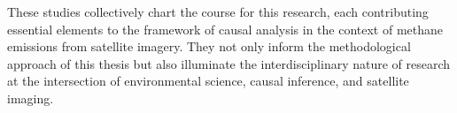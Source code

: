 These studies collectively chart the course for this research, each contributing essential elements to the framework of causal analysis in the context of methane emissions from satellite imagery. They not only inform the methodological approach of this thesis but also illuminate the interdisciplinary nature of research at the intersection of environmental science, causal inference, and satellite imaging.









